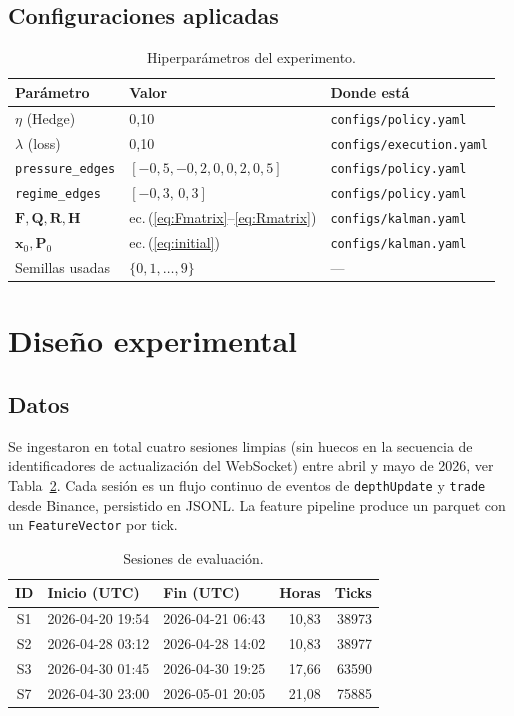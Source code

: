 \documentclass[journal,onecolumn,11pt]{IEEEtran}
\newcommand{\xv}{\mathbf{x}}
\newcommand{\Fm}{\mathbf{F}}
\newcommand{\Hm}{\mathbf{H}}
\newcommand{\Qm}{\mathbf{Q}}
\newcommand{\Rm}{\mathbf{R}}
\newcommand{\Pm}{\mathbf{P}}
\begin{document}
\subsection{Configuraciones aplicadas}

\begin{table}[!htbp]
\caption{Hiperparámetros del experimento.}
\label{tab:hiperparams}
\centering\small
\begin{tabular}{lll}
\toprule
Parámetro & Valor & Donde está \\
\midrule
$\eta$ (Hedge)        & 0{,}10  & \texttt{configs/policy.yaml} \\
$\lambda$ (loss)      & 0{,}10  & \texttt{configs/execution.yaml} \\
\texttt{pressure\_edges} & $[-0{,}5,-0{,}2,0,0{,}2,0{,}5]$ & \texttt{configs/policy.yaml} \\
\texttt{regime\_edges}   & $[-0{,}3,\,0{,}3]$ & \texttt{configs/policy.yaml} \\
$\Fm,\Qm,\Rm,\Hm$       & ec.\,(\ref{eq:Fmatrix}--\ref{eq:Rmatrix}) & \texttt{configs/kalman.yaml} \\
$\xv_0,\Pm_0$           & ec.\,(\ref{eq:initial}) & \texttt{configs/kalman.yaml} \\
Semillas usadas         & $\{0,1,\ldots,9\}$ & --- \\
\bottomrule
\end{tabular}
\end{table}

\section{Diseño experimental}\label{sec:experimentos}

\subsection{Datos}

Se ingestaron en total cuatro sesiones limpias (sin huecos en la
secuencia de identificadores de actualización del WebSocket) entre
abril y mayo de 2026, ver Tabla~\ref{tab:sesiones}. Cada sesión es un
flujo continuo de eventos de \texttt{depthUpdate} y \texttt{trade}
desde Binance, persistido en JSONL. La feature pipeline produce un
parquet con un \texttt{FeatureVector} por tick.

\begin{table}[!htbp]
\caption{Sesiones de evaluación.}
\label{tab:sesiones}
\centering\small
\begin{tabular}{cllrr}
\toprule
ID & Inicio (UTC) & Fin (UTC) & Horas & Ticks \\
\midrule
S1 & 2026-04-20 19:54 & 2026-04-21 06:43 & 10{,}83 & \num{38973} \\
S2 & 2026-04-28 03:12 & 2026-04-28 14:02 & 10{,}83 & \num{38977} \\
S3 & 2026-04-30 01:45 & 2026-04-30 19:25 & 17{,}66 & \num{63590} \\
S7 & 2026-04-30 23:00 & 2026-05-01 20:05 & 21{,}08 & \num{75885} \\
\bottomrule
\end{tabular}
\end{table}
\end{document}

